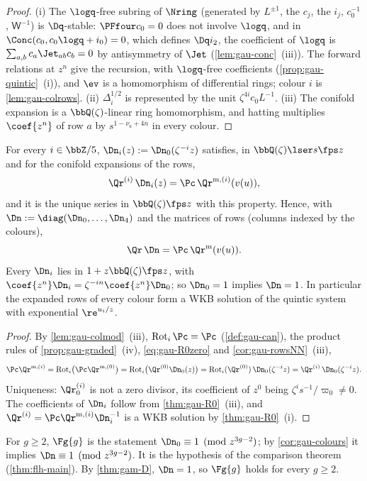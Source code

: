 \begin{proof}
(i) The $\logq$-free subring of $\Nring$ (generated by $L^{\pm1}$, the $c_j$, the $i_j$, $c_0^{-1}$, $\mathsf W^{-1}$) is $\Dq$-stable: $\PFfour c_0=0$ does not involve $\logq$, and in $\Conc(c_0,c_0\logq+i_0)=0$, which defines $\Dq i_2$, the coefficient of $\logq$ is $\sum_{a,b}c_a\Jet_{ab}c_b=0$ by antisymmetry of $\Jet$ (\cref{lem:gau-conc}~(iii)). The forward relations at $z^n$ give the recursion, with $\logq$-free coefficients (\cref{prop:gau-quintic}~(i)), and $\ev$ is a homomorphism of differential rings; colour $i$ is \cref{lem:gau-colrows}. (ii) $\Delta_i^{1/2}$ is represented by the unit $\zeta^{4i}c_0L^{-1}$. (iii) The conifold expansion is a $\bbQ(\zeta)$-linear ring homomorphism, and hatting multiplies $\coef{z^n}$ of row $a$ by $s^{1-\nu_a+4n}$ in every colour.
\end{proof}

\begin{cor}
\label{cor:gau-colours}
For every $i\in\bbZ/5$, $\Dn_i(z):=\Dn_0(\zeta^{-i}z)$ satisfies, in $\bbQ(\zeta)\lser s\fps z$ and for the conifold expansions of the rows,
\[
\Qr^{(i)}\,\Dn_i(z)=\Pc\,\Qr^{\mathrm m,(i)}(v(u)),
\]
and it is the unique series in $\bbQ(\zeta)\fps z$ with this property. Hence, with $\Dn:=\diag(\Dn_0,\dots,\Dn_4)$ and the matrices of rows (columns indexed by the colours),
\begin{equation}
\label{eq:gau-R0}
\Qr\,\Dn=\Pc\,\Qr^{\mathrm m}(v(u)).
\end{equation}
Every $\Dn_i$ lies in $1+z\bbQ(\zeta)\fps z$, with $\coef{z^n}\Dn_i=\zeta^{-in}\coef{z^n}\Dn_0$; so $\Dn_0=1$ implies $\Dn=1$. In particular the expanded rows of every colour form a WKB solution of the quintic system with exponential $\re^{u_i/z}$.
\end{cor}

\begin{proof}
By \cref{lem:gau-colmod}~(iii), $\operatorname{Rot}_i\Pc=\Pc$ (\cref{def:gau-can}), the product rules of \cref{prop:gau-graded}~(iv), \eqref{eq:gau-R0zero} and \cref{cor:gau-rowsNN}~(iii),
\[
\Pc\Qr^{\mathrm m,(i)}=\operatorname{Rot}_i\bigl(\Pc\Qr^{\mathrm m,(0)}\bigr)=\operatorname{Rot}_i\bigl(\Qr^{(0)}\Dn_0(z)\bigr)=\operatorname{Rot}_i(\Qr^{(0)})\,\Dn_0(\zeta^{-i}z)=\Qr^{(i)}\,\Dn_0(\zeta^{-i}z).
\]
Uniqueness: $\Qr^{(i)}_0$ is not a zero divisor, its coefficient of $z^0$ being $\zeta^is^{-1}/\varpi_0\neq0$. The coefficients of $\Dn_i$ follow from \cref{thm:gau-R0}~(iii), and $\Qr^{(i)}=\Pc\Qr^{\mathrm m,(i)}\Dn_i^{-1}$ is a WKB solution by \cref{thm:gau-R0}~(i).
\end{proof}

\begin{defn}
\label{def:gau-Fg}
For $g\geq2$, $\Fg{g}$ is the statement $\Dn_0\equiv1\pmod{z^{3g-2}}$; by \cref{cor:gau-colours} it implies $\Dn\equiv1\pmod{z^{3g-2}}$. It is the hypothesis of the comparison theorem (\cref{thm:flh-main}). By \cref{thm:gam-D}, $\Dn=1$, so $\Fg{g}$ holds for every $g\geq2$.
\end{defn}
